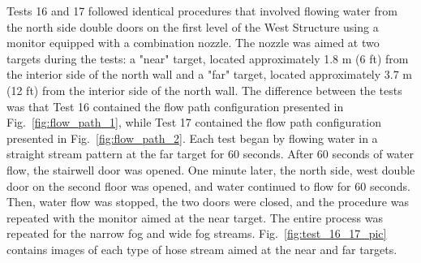 \documentclass[12pt,oneside]{book}
\begin{document}
Tests 16 and 17 followed identical procedures that involved flowing water from the north side double doors on the first level of the West Structure using a monitor equipped with a combination nozzle. The nozzle was aimed at two targets during the tests: a "near" target, located approximately 1.8 m (6 ft) from the interior side of the north wall and a "far" target, located approximately 3.7 m (12 ft) from the interior side of the north wall. The difference between the tests was that Test 16 contained the flow path configuration presented in Fig.~\ref{fig:flow_path_1}, while Test 17 contained the flow path configuration presented in Fig.~\ref{fig:flow_path_2}. Each test began by flowing water in a straight stream pattern at the far target for 60 seconds. After 60 seconds of water flow, the stairwell door was opened. One minute later, the north side, west double door on the second floor was opened, and water continued to flow for 60 seconds. Then, water flow was stopped, the two doors were closed, and the procedure was repeated with the monitor aimed at the near target. The entire process was repeated for the narrow fog and wide fog streams. Fig.~\ref{fig:test_16_17_pic} contains images of each type of hose stream aimed at the near and far targets.
\end{document}
